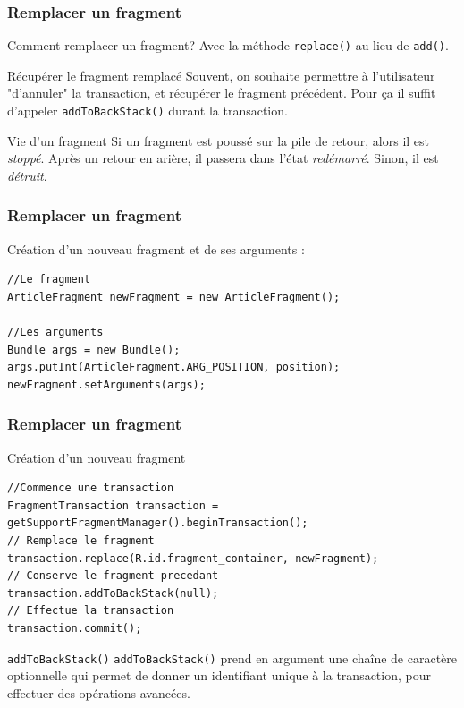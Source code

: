 \documentclass{beamer}
\begin{document}
\begin{frame}
\frametitle{Remplacer un fragment}

\begin{block}{Comment remplacer un fragment?}
Avec la méthode \verb!replace()! au lieu de \verb!add()!.
\end{block}
\pause
\begin{block}{Récupérer le fragment remplacé}
Souvent, on souhaite permettre à l'utilisateur "d'annuler" la transaction, et récupérer le fragment précédent. Pour ça il suffit d’appeler \verb!addToBackStack()! durant la transaction.
\end{block}
\pause
\begin{block}{Vie d'un fragment}
Si un fragment est poussé sur la pile de retour, alors il est \emph{stoppé}. Après un retour en arière, il passera dans l'état \emph{redémarré}. Sinon, il est \emph{détruit}.
\end{block}

\end{frame}

\begin{frame}[fragile]
\frametitle{Remplacer un fragment}

\begin{exampleblock}{Création d'un nouveau fragment et de ses arguments :}
\begin{lstlisting}
//Le fragment
ArticleFragment newFragment = new ArticleFragment();

//Les arguments
Bundle args = new Bundle();
args.putInt(ArticleFragment.ARG_POSITION, position);
newFragment.setArguments(args);
\end{lstlisting}
\end{exampleblock}

\end{frame}
\begin{frame}[fragile]
\frametitle{Remplacer un fragment}

\begin{exampleblock}{Création d'un nouveau fragment}
\begin{lstlisting}
//Commence une transaction
FragmentTransaction transaction = getSupportFragmentManager().beginTransaction();
// Remplace le fragment
transaction.replace(R.id.fragment_container, newFragment);
// Conserve le fragment precedant
transaction.addToBackStack(null);
// Effectue la transaction
transaction.commit();
\end{lstlisting}
\end{exampleblock}


\begin{block}{\verb!addToBackStack()!}
\verb!addToBackStack()! prend en argument une chaîne de caractère optionnelle qui permet de donner un identifiant unique à la transaction, pour effectuer des opérations avancées.
\end{block}

\end{frame}
\end{document}
